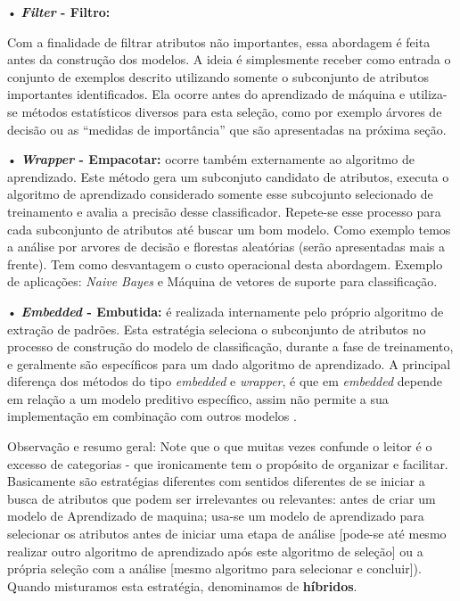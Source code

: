 \documentclass[
]{book}
\begin{document}
• \textbf{\emph{Filter} - Filtro:}

Com a finalidade de filtrar atributos não importantes, essa abordagem é feita antes da construção dos modelos. A ideia é simplesmente receber como entrada o
conjunto de exemplos descrito utilizando somente o subconjunto de atributos importantes identificados. Ela ocorre antes do aprendizado de máquina \citep{john1994irrelevant} e utiliza-se métodos estatísticos diversos para esta seleção, como por exemplo árvores de decisão ou as ``medidas de importância'' que são apresentadas na próxima seção.

• \textbf{\emph{Wrapper} - Empacotar:} ocorre também externamente ao algoritmo de aprendizado. Este método gera um subconjuto candidato de atributos, executa o algoritmo de aprendizado considerado somente esse subcojunto selecionado de treinamento e avalia a precisão desse classificador. Repete-se esse processo para cada subconjunto de atributos até buscar um bom modelo. Como exemplo temos a análise por arvores de decisão e florestas aleatórias (serão apresentadas mais a frente). Tem como desvantagem o custo operacional desta abordagem. Exemplo de aplicações: \emph{Naive Bayes} e Máquina de vetores de suporte para classificação.

• \textbf{\emph{Embedded} - Embutida:} é realizada internamente pelo próprio algoritmo de extração de padrões. Esta estratégia seleciona o subconjunto de atributos no processo de construção do modelo de classificação, durante a fase de treinamento, e geralmente são específicos para um dado algoritmo de aprendizado. A principal diferença dos métodos do tipo \emph{embedded} e \emph{wrapper},
é que em \emph{embedded} depende em relação a um modelo preditivo específico, assim não permite a sua implementação em combinação com outros modelos \citep{souza2014computational}.

Observação e resumo geral: Note que o que muitas vezes confunde o leitor é o excesso de categorias - que ironicamente tem o propósito de organizar e facilitar. Basicamente são estratégias diferentes com sentidos diferentes de se iniciar a busca de atributos que podem ser irrelevantes ou relevantes: antes de criar um modelo de Aprendizado de maquina; usa-se um modelo de aprendizado para selecionar os atributos antes de iniciar uma etapa de análise {[}pode-se até mesmo realizar outro algoritmo de aprendizado após este algoritmo de seleção{]} ou a própria seleção com a análise {[}mesmo algoritmo para selecionar e concluir{]}). Quando misturamos esta estratégia, denominamos de \textbf{híbridos}.
\end{document}
